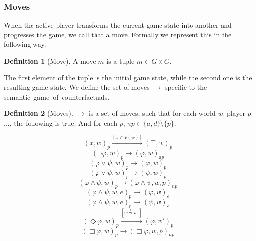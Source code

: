 \documentclass[a4paper,american]{paper}
\theoremstyle{definition}\newtheorem{definition}{Definition}
\begin{document}
\subsubsection{Moves}
When the active player transforms the current game state into another and progresses the game, we call that a move. Formally we represent this in the following way.
\begin{definition}[Move]
A move $m$ is a tuple $m\in G\times G$.
\end{definition}
\noindent The first element of the tuple is the initial game state, while the second one is the resulting game state. We define the set of moves $\rightarrow$ specific to the semantic~game~of~counterfactuals.
\begin{definition}[Moves]
$\rightarrow$ is a set of moves, such that for each world $w$, player $p$ ..., the following is true. And for each $p$, $np\in \{ a,d\}\setminus{}\{p\}$.
\begin{figure}[H]
	\centering
	\begin{equation}
		(x ,w)_{p}\xrightarrow{[x\in F(w)]} (\top ,w)_{p}
	\end{equation}
	\begin{equation}
		(\neg\varphi ,w)_{p}\rightarrow (\varphi ,w)_{np}
	\end{equation}
	\begin{equation}
		(\varphi\vee\psi ,w)_{p}\rightarrow (\varphi ,w)_{p}
	\end{equation}
	\begin{equation}
		(\varphi\vee\psi ,w)_{p}\rightarrow (\psi ,w)_{p}
	\end{equation}
	\begin{equation}
		(\varphi\wedge\psi ,w)_{p}\rightarrow (\varphi\wedge\psi ,w,p)_{np}
	\end{equation}
	\begin{equation}
		(\varphi\wedge\psi ,w,e)_{p}\rightarrow (\varphi ,w)_{e}
	\end{equation}
	\begin{equation}
		(\varphi\wedge\psi ,w,e)_{p}\rightarrow (\psi ,w)_{e}
	\end{equation}
	\begin{equation}
		(\Diamond\varphi ,w)_{p}\xrightarrow{[w\overset{r}{\leadsto}w']} (\varphi ,w')_{p}
	\end{equation}
	\begin{equation}
		(\Box\varphi ,w)_{p}\rightarrow (\Box\varphi ,w,p)_{np}
	\end{equation}
	\begin{equation}

\end{equation}
\end{figure}
\end{definition}
\end{document}
